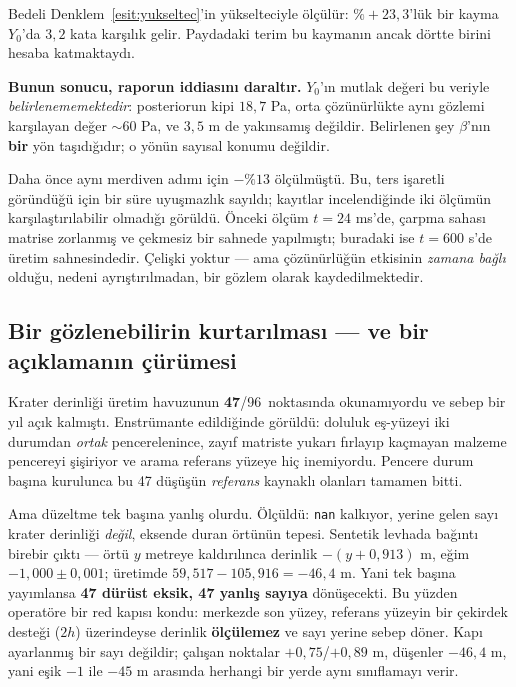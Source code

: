 \documentclass[12pt,a4paper]{article}
\newcommand{\havuzToplam}{96}
\begin{document}
Bedeli Denklem~\eqref{esit:yukseltec}'in yükselteciyle ölçülür:
$\%{+}23{,}3$'lük bir kayma $Y_0$'da $3{,}2$ kata karşılık gelir.
Paydadaki terim bu kaymanın ancak dörtte birini hesaba katmaktaydı.

\begin{sinir}
\textbf{Bunun sonucu, raporun iddiasını daraltır.} $Y_0$'ın mutlak
değeri bu veriyle \emph{belirlenememektedir}: posteriorun kipi
$18{,}7$ Pa, orta çözünürlükte aynı gözlemi karşılayan değer
$\sim\!60$ Pa, ve $3{,}5$ m de yakınsamış değildir. Belirlenen şey
$\beta$'nın \textbf{bir} yön taşıdığıdır; o yönün sayısal konumu
değildir.

Daha önce aynı merdiven adımı için $-\%13$ ölçülmüştü. Bu, ters
işaretli göründüğü için bir süre uyuşmazlık sayıldı; kayıtlar
incelendiğinde iki ölçümün karşılaştırılabilir olmadığı görüldü.
Önceki ölçüm $t = 24$ ms'de, çarpma sahası matrise zorlanmış ve
çekmesiz bir sahnede yapılmıştı; buradaki ise $t = 600$ s'de üretim
sahnesindedir. Çelişki yoktur --- ama çözünürlüğün etkisinin
\emph{zamana bağlı} olduğu, nedeni ayrıştırılmadan, bir gözlem
olarak kaydedilmektedir.
\end{sinir}

\subsection{Bir gözlenebilirin kurtarılması --- ve bir açıklamanın çürümesi}

Krater derinliği üretim havuzunun \textbf{47}/\havuzToplam\ noktasında
okunamıyordu ve sebep bir yıl açık kalmıştı. Enstrümante edildiğinde
görüldü: doluluk eş-yüzeyi iki durumdan \emph{ortak} pencerelenince,
zayıf matriste yukarı fırlayıp kaçmayan malzeme pencereyi şişiriyor ve
arama referans yüzeye hiç inemiyordu. Pencere durum başına kurulunca
bu 47 düşüşün \emph{referans} kaynaklı olanları tamamen bitti.

Ama düzeltme tek başına yanlış olurdu. Ölçüldü: \verb|nan| kalkıyor,
yerine gelen sayı krater derinliği \emph{değil}, eksende duran örtünün
tepesi. Sentetik levhada bağıntı birebir çıktı --- örtü $y$ metreye
kaldırılınca derinlik $-(y + 0{,}913)$ m, eğim $-1{,}000\pm0{,}001$;
üretimde $59{,}517 - 105{,}916 = -46{,}4$ m. Yani tek başına
yayımlansa \textbf{47 dürüst eksik, 47 yanlış sayıya} dönüşecekti. Bu
yüzden operatöre bir red kapısı kondu: merkezde son yüzey, referans
yüzeyin bir çekirdek desteği ($2h$) üzerindeyse derinlik
\textbf{ölçülemez} ve sayı yerine sebep döner. Kapı ayarlanmış bir
sayı değildir; çalışan noktalar $+0{,}75$/$+0{,}89$ m, düşenler
$-46{,}4$ m, yani eşik $-1$ ile $-45$ m arasında herhangi bir yerde
aynı sınıflamayı verir.
\end{document}
